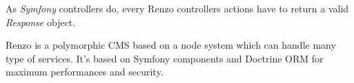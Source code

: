 \documentclass[letterpaper,10pt,english]{sphinxmanual}
\begin{document}
As \emph{Symfony} controllers do, every Renzo controllers actions have to return a valid \emph{Response} object.

Renzo is a polymorphic CMS based on a node system which can handle many type of services.
It’s based on Symfony components and Doctrine ORM for maximum performances and security.



\renewcommand{\indexname}{Index}
\printindex
\end{document}
